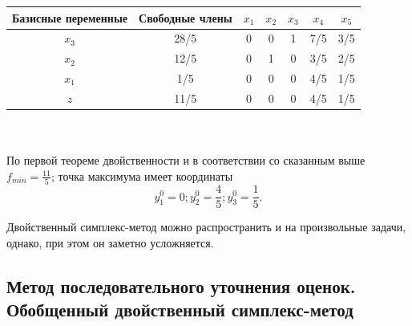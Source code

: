 {\begin{tabular}{| c | c | c | c | c | c | c |}
\hline
Базисные переменные & Свободные члены & $x_1$ & $x_2$ & $x_3$ & $x_4$ & $x_5$ \\ \hline
$x_3$ & 28/5 & 0 & 0 & 1 & 7/5 & 3/5 \\ \hline
$x_2$ & 12/5 & 0 & 1 & 0 & 3/5 & 2/5 \\ \hline
$x_1$ & 1/5 & 0 & 0 & 0 & 4/5 & 1/5 \\ \hline
$z$ & 11/5 & 0 & 0 & 0 & 4/5 & 1/5 \\ \hline
\end{tabular} \\ \\

По первой теореме двойственности и в соответствии со сказанным выше $f_{min} = \frac{11}{5}$; точка максимума имеет координаты
\[
y^0_1 = 0; y^0_2 = \frac{4}{5}; y^0_3 = \frac{1}{5}.
\]
}

Двойственный симплекс-метод можно распространить и на произвольные задачи, однако, при этом он заметно усложняется.

\subsection{ Метод последовательного уточнения оценок. Обобщенный двойственный симплекс-метод}

